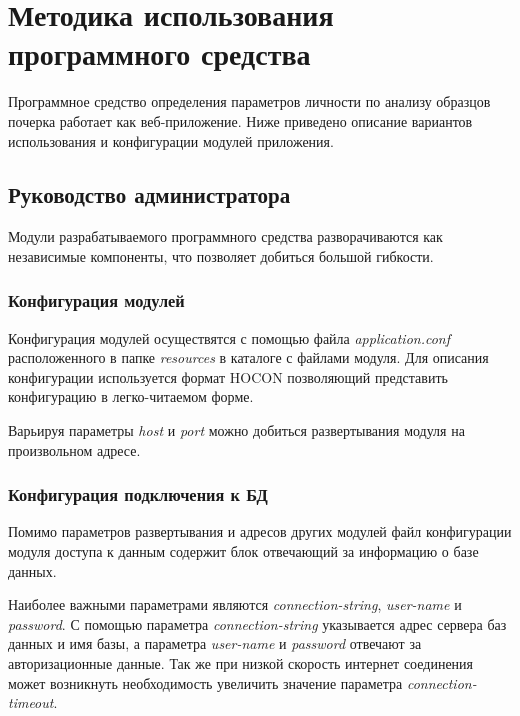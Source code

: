 \section{Методика использования программного средства}
\label{sec:manpage}

Программное средство определения параметров личности по анализу образцов почерка работает как веб-приложение. Ниже приведено описание вариантов использования и конфигурации модулей приложения.

\subsection{Руководство администратора}
\label{sec:manpage:admin_man}
Модули разрабатываемого программного средства разворачиваются как независимые компоненты, что позволяет добиться большой гибкости.

\subsubsection{Конфигурация модулей}
Конфигурация модулей осуществятся с помощью файла \emph{application.conf} расположенного в папке \emph{resources} в каталоге с файлами модуля. Для описания конфигурации используется формат HOCON позволяющий представить конфигурацию в легко-читаемом форме. 



Варьируя параметры \emph{host} и \emph{port} можно добиться развертывания модуля на произвольном адресе.

\subsubsection{Конфигурация подключения к БД}
Помимо параметров развертывания и адресов других модулей файл конфигурации модуля доступа к данным содержит блок отвечающий за информацию о базе данных.



Наиболее важными параметрами являются \emph{connection-string}, \emph{user-name} и \emph{password}. С помощью параметра \emph{connection-string} указывается адрес сервера баз данных и имя базы, а параметра \emph{user-name} и \emph{password} отвечают за авторизационные данные. Так же при низкой скорость интернет соединения может возникнуть необходимость увеличить значение параметра \emph{connection-timeout}.

